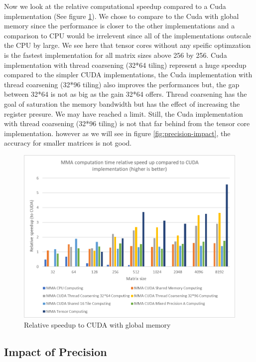 \documentclass[conference]{IEEEtran}
\begin{document}
  Now we look at the relative computational speedup compared to a Cuda implementation (See figure \ref{fig:performance-comparison}).
  We chose to compare to the Cuda with global memory since the performance is closer to 
  the other implementations and a comparison to CPU would be irrelevent since all of the implementations
  outscale the CPU by large. We see here that tensor cores without any speific optimzation is the fastest
  implementation for all matrix sizes above 256 by 256. Cuda implementation with thread coarsening (32*64 tiling) represent a huge
  speedup compared to the simpler CUDA implementations, the Cuda implementation with thread coarsening (32*96 tiling) also improves
  the performances but, the gap between 32*64 is not as big as the gain 32*64 offers. Thread coarsening has the goal
  of saturation the memory bandwidth but has the effect of increasing the register presure. We may have reached a limit.
  Still, the Cuda implementation with thread coarsening (32*96 tiling) is not that far behind from the tensor core implementation.
  however as we will see in figure \ref{fig:precision-impact}, the accuracy for smaller matrices is not good.

  \begin{figure}[h]
    \centering
    \includegraphics[scale=0.53]{figures/relative_speedup_2.png}
    \caption{Relative speedup to CUDA with global memory}
    \label{fig:performance-comparison}
  \end{figure}
  
  
  
  \subsection{Impact of Precision}\label{sec:impact-precision}
  
\end{document}
